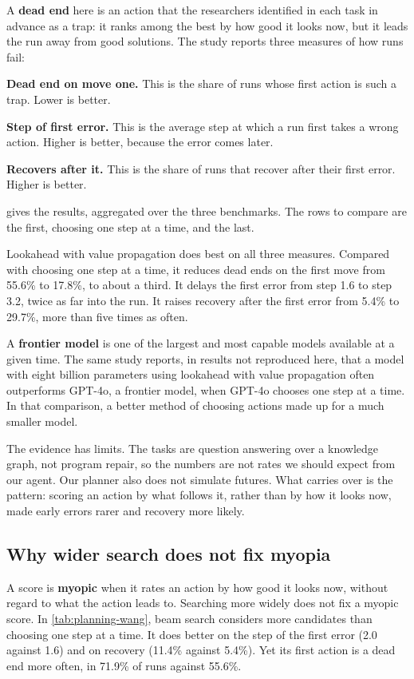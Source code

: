 A \textbf{dead end} here is an action that the researchers identified in each task in advance as a
trap: it ranks among the best by how good it looks now, but it leads the run away from good
solutions. The study reports three measures of how runs fail:
\bi
\item \textbf{Dead end on move one.} This is the share of runs whose first action is such a trap.
Lower is better.
\item \textbf{Step of first error.} This is the average step at which a run first takes a wrong
action. Higher is better, because the error comes later.
\item \textbf{Recovers after it.} This is the share of runs that recover after their first error.
Higher is better.
\ei

 gives the results, aggregated over the three benchmarks. The rows to compare
are the first, choosing one step at a time, and the last.

Lookahead with value propagation does best on all three measures. Compared with choosing one step at
a time, it reduces dead ends on the first move from 55.6\% to 17.8\%, to about a third. It delays the
first error from step 1.6 to step 3.2, twice as far into the run. It raises recovery after the first
error from 5.4\% to 29.7\%, more than five times as often.

A \textbf{frontier model} is one of the largest and most capable models available at a given time.
The same study reports, in results not reproduced here, that a model with eight billion parameters
using lookahead with value propagation often outperforms GPT-4o, a frontier model, when GPT-4o
chooses one step at a time. In that comparison,
a better method of choosing actions made up for a much smaller model.

The evidence has limits. The tasks are question answering over a knowledge graph, not program
repair, so the numbers are not rates we should expect from our agent. Our planner also does not
simulate futures. What carries over is the pattern: scoring an action by what follows it, rather
than by how it looks now, made early errors rarer and recovery more likely.

\subsection{Why wider search does not fix myopia}
\label{sec:planning-myopia}

A score is \textbf{myopic} when it rates an action by how good it looks now, without regard to what
the action leads to. Searching more widely does not fix a myopic score. In \cref{tab:planning-wang},
beam search considers more candidates than choosing one step at a time. It does better on the step
of the first error (2.0 against 1.6) and on recovery (11.4\% against 5.4\%). Yet its first
action is a dead end more often, in 71.9\% of runs against 55.6\%.

